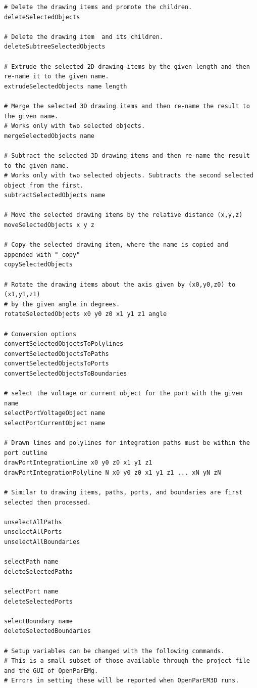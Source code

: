 \documentclass[titlepage]{article}
\renewcommand\_{\textunderscore\linebreak[1]}
\begin{document}
\begin{Verbatim}[fontsize=\small]
# Delete the drawing items and promote the children.
deleteSelectedObjects

# Delete the drawing item  and its children.
deleteSubtreeSelectedObjects

# Extrude the selected 2D drawing items by the given length and then re-name it to the given name.
extrudeSelectedObjects name length

# Merge the selected 3D drawing items and then re-name the result to the given name.
# Works only with two selected objects.
mergeSelectedObjects name

# Subtract the selected 3D drawing items and then re-name the result to the given name.
# Works only with two selected objects. Subtracts the second selected object from the first.
subtractSelectedObjects name

# Move the selected drawing items by the relative distance (x,y,z)
moveSelectedObjects x y z

# Copy the selected drawing item, where the name is copied and appended with "_copy"
copySelectedObjects

# Rotate the drawing items about the axis given by (x0,y0,z0) to (x1,y1,z1)
# by the given angle in degrees.
rotateSelectedObjects x0 y0 z0 x1 y1 z1 angle

# Conversion options
convertSelectedObjectsToPolylines
convertSelectedObjectsToPaths
convertSelectedObjectsToPorts
convertSelectedObjectsToBoundaries

# select the voltage or current object for the port with the given name
selectPortVoltageObject name
selectPortCurrentObject name

# Drawn lines and polylines for integration paths must be within the port outline
drawPortIntegrationLine x0 y0 z0 x1 y1 z1
drawPortIntegrationPolyline N x0 y0 z0 x1 y1 z1 ... xN yN zN

# Similar to drawing items, paths, ports, and boundaries are first selected then processed.

unselectAllPaths
unselectAllPorts
unselectAllBoundaries

selectPath name
deleteSelectedPaths

selectPort name
deleteSelectedPorts

selectBoundary name
deleteSelectedBoundaries

# Setup variables can be changed with the following commands.
# This is a small subset of those available through the project file and the GUI of OpenParEMg.
# Errors in setting these will be reported when OpenParEM3D runs.


\end{Verbatim}
\end{document}
